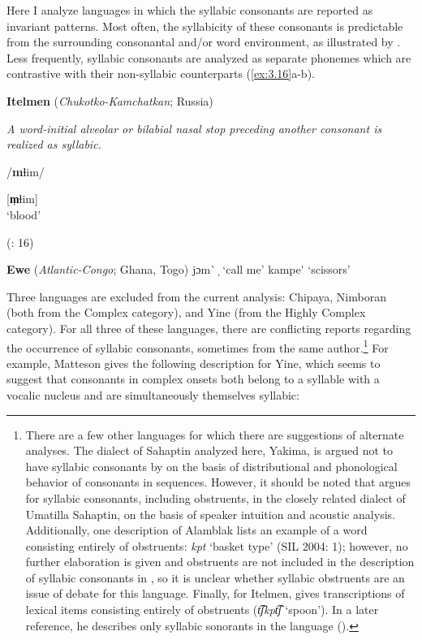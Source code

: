   Here I analyze languages in which the syllabic consonants are reported as invariant patterns. Most often, the syllabicity of these consonants is predictable from the surrounding consonantal and/or word environment, as illustrated by . Less frequently, syllabic consonants are analyzed as separate phonemes which are contrastive with their non-syllabic counterparts (\ref{ex:3.16}a-b).

\ea\label{ex:3.15}
  \textbf{Itelmen} (\textit{Chukotko-Kamchatkan}; Russia)

\textit{A word-initial alveolar or bilabial nasal stop preceding another consonant is realized as syllabic.}

/\textbf{m}ɬim/

[\textbf{m̩}ɬim]\\
\glt ‘blood’

(\citealt{GeorgVolodin1999}: 16)
\z

\ea\label{ex:3.16}
  \textbf{Ewe} (\textit{Atlantic-Congo}; Ghana, Togo)
\ea   jɔm\`{} ̩
\glt  ‘call me’
\ex kampe\'{} 
\glt  ‘scissors’
\citep[38]{Ameka1991}
\z
\z

  Three languages are excluded from the current analysis: Chipaya, Nimboran (both from the Complex category), and Yine (from the Highly Complex category). For all three of these languages, there are conflicting reports regarding the occurrence of syllabic consonants, sometimes from the same author.\footnote{{There are a few other languages for which there are suggestions of alternate analyses. The dialect of Sahaptin analyzed here, Yakima, is argued not to have syllabic consonants by \citet{HargusBeavert2006} on the basis of distributional and phonological behavior of consonants in sequences. However, it should be noted that \citet{Minthorn2005} argues for syllabic consonants, including obstruents, in the closely related dialect of Umatilla Sahaptin, on the basis of speaker intuition and acoustic analysis. Additionally, one description of Alamblak lists an example of a word consisting entirely of obstruents:} \textrm{\textit{kpt}} \textrm{‘basket type’ (SIL 2004: 1); however, no further elaboration is given and obstruents are not included in the description of syllabic consonants in \citet{Bruce1984}, so it is unclear whether syllabic obstruents are an issue of debate for this language. Finally, for Itelmen, \citet[42]{Volodin1976} gives transcriptions of lexical items consisting entirely of obstruents (}\textrm{\textit{t͡ʃkpt͡ʃ} }\textrm{‘spoon’). In a later reference, he describes only syllabic sonorants in the language (\citealt{GeorgVolodin1999}).}} For example, Matteson gives the following description for Yine, which seems to suggest that consonants in complex onsets both belong to a syllable with a vocalic nucleus and are simultaneously themselves syllabic:

